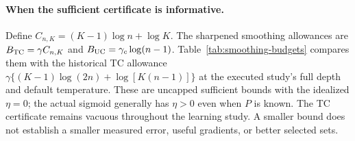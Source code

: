 \paragraph{When the sufficient certificate is informative.}\label{app:bias-budget}
Define $C_{n,K}=(K-1)\log n+\log K$. The sharpened smoothing allowances are $B_{\mathrm{TC}}=\gamma C_{n,K}$ and $B_{\mathrm{UC}}=\gamma_c\log(n-1)$. Table~\ref{tab:smoothing-budgets} compares them with the historical TC allowance $\gamma\{(K-1)\log(2n)+\log[K(n-1)]\}$ at the executed study's full depth and default temperature. These are uncapped sufficient bounds with the idealized $\eta=0$; the actual sigmoid generally has $\eta>0$ even when $P$ is known. The TC certificate remains vacuous throughout the learning study. A smaller bound does not establish a smaller measured error, useful gradients, or better selected sets.

\begin{table}[ht]\centering\small

\caption{Smoothing-only allowances at $\gamma=\gamma_c=0.035$, $K=n-1$. Values greater than one are uninformative for score recovery. Statistical/edge-smoothing error must additionally fit within the threshold allowance.}
\label{tab:smoothing-budgets}\end{table}


